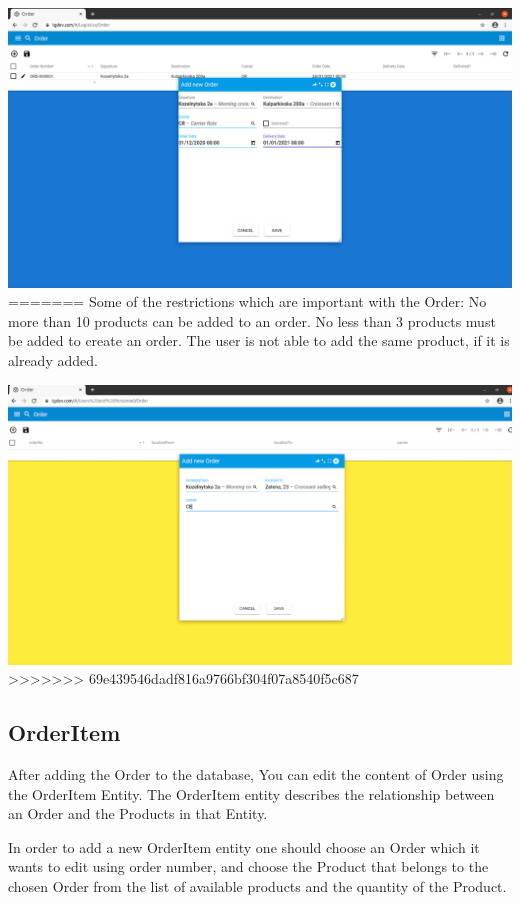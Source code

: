 \includegraphics[width=\textwidth]{sections/01-chapter/images/order14.png}
=======
Some of the restrictions which are important with the Order:
No more than 10 products can be added to an order.
No less than 3 products must be added to create an order.
The user is not able to add the same product, if it is already added.

\includegraphics[width=\textwidth]{sections/01-chapter/images/order4.png}
>>>>>>> 69e439546dadf816a9766bf304f07a8540f5c687

\subsection{OrderItem}

After adding the Order to the database, You can edit the content of Order using the OrderItem Entity. The OrderItem entity describes the relationship between an Order and the Products in that Entity. 

In order to add a new OrderItem entity one should choose an Order which it wants to edit using order number, and choose the Product that belongs to the chosen Order from the list of available products and the quantity of the Product. 

